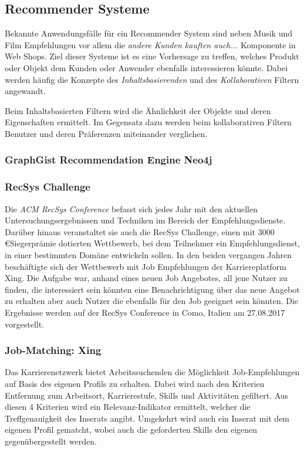 \subsection{Recommender Systeme}

Bekannte Anwendungsfälle für ein Recommender System sind neben Musik und Film Empfehlungen vor allem die \textit{andere Kunden kauften auch...} Komponente in Web Shops. Ziel dieser Systeme ist es eine Vorhersage zu treffen, welches Produkt oder Objekt dem Kunden oder Anwender ebenfalls interessieren könnte. Dabei werden häufig die Konzepte des \textit{Inhaltsbasierenden} und des \textit{Kollaborativen} Filtern angewandt. 

Beim Inhaltsbasierten Filtern wird die Ähnlichkeit der Objekte und deren Eigenschaften ermittelt. Im Gegensatz dazu werden beim kollaborativen Filtern Benutzer und deren Präferenzen miteinander verglichen. 


\subsubsection{GraphGist Recommendation Engine Neo4j}

\subsubsection{RecSys Challenge}

Die \textit{ACM RecSys Conference} befasst sich jedes Jahr mit den aktuellen Untersuchungsergebnissen und Techniken im Bereich der Empfehlungsdienste. Darüber hinaus veranstaltet sie auch die RecSys Challenge, einen mit 3000 \euro  Siegerprämie dotierten Wettbewerb, bei dem Teilnehmer ein Empfehlungsdienst, in einer bestimmten Domäne entwickeln sollen. In den beiden vergangen Jahren beschäftigte sich der Wettbewerb mit Job Empfehlungen der Karriereplatform Xing. Die Aufgabe war, anhand eines neuen Job Angebotes, all jene Nutzer zu finden, die interessiert sein könnten eine Benachrichtigung über das neue Angebot zu erhalten aber auch Nutzer die ebenfalls für den Job geeignet sein könnten. Die Ergebnisse werden auf der RecSys Conference in Como, Italien am 27.08.2017 vorgestellt.
\subsubsection{Job-Matching: Xing}

Das Karrierenetzwerk bietet Arbeitssuchenden die Möglichkeit Job-Empfehlungen auf Basis des eigenen Profils zu erhalten. Dabei wird nach den Kriterien Entfernung zum Arbeitsort, Karrierestufe, Skills und Aktivitäten gefiltert. Aus diesen 4 Kriterien wird ein Relevanz-Indikator ermittelt, welcher die Treffgenauigkeit des Inserats angibt. Umgekehrt wird auch ein Inserat mit dem eigenen Profil gematcht, wobei auch die geforderten Skills den eigenen gegenübergestellt werden.\cite{hoelscher}

